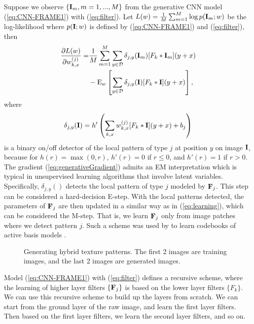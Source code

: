 \documentclass[letterpaper]{article}
\def\E{{\rm E}}
\def\I{{\bf I}}
\def\F{{\bf F}}
\begin{document}
Suppose we observe $\{\I_m, m = 1, ..., M\}$ from  the generative CNN model (\ref{eq:CNN-FRAME1}) with (\ref{eq:filter}). Let $L(w) = \frac{1}{M} \sum_{m=1}^{M} \log p(\I_m; w)$ be the log-likelihood where $p(\I; w)$ is defined by (\ref{eq:CNN-FRAME1}) and (\ref{eq:filter}), then 
\begin{equation}
\begin{aligned}
\frac{\partial L(w)}{\partial w_{k, x}^{(j)}} =& \frac{1}{M} \sum_{m=1}^{M}\sum_{y \in {\cal D}} \delta_{j, y}(\I_m)  [F_{k} * \I_m](y+x) \\
      &   -  \E_{w} \left[ \sum_{y \in {\cal D}} \delta_{j, y}(\I)  [F_{k} * \I](y+x)\right], 
\end{aligned}
\label{eq:generativeGradient}
\end{equation}
where 
\begin{eqnarray}
\delta_{j, y}(\I) = h'\left( \sum_{k,  x} w^{(j)}_{k,   x}  [F_{k} * \I](y+x) +b_j\right)
\label{eq:detector}
\end{eqnarray}
is a binary on/off detector of the local pattern of type $j$ at position $y$ on image $\I$,  because for $h(r) = \max(0, r)$, $h'(r) = 0$ if $r  \leq  0$, and $h'(r) = 1$ if $r > 0$.  The gradient (\ref{eq:generativeGradient}) admits an EM \citep{dempster1977maximum} interpretation which is typical in unsupervised learning algorithms that involve latent  variables. Specifically, $\delta_{j, y}()$ detects the local pattern of type $j$  modeled by $\F_j$. This step can be considered a hard-decision E-step. With the local patterns detected,  the parameters of $\F_j$ are then updated in a similar way as in (\ref{eq:learning}),  which can be considered the M-step. That is, we learn $\F_j$ only from image patches where we detect pattern  $j$. Such a scheme was used by \cite{Hongyi2014} to learn codebooks of active basis models \citep{AB}. 


\begin{figure}
	\centering
	\setlength{\fboxrule}{1pt}
	\setlength{\fboxsep}{0cm}
			\caption{Generating hybrid texture patterns. 
		The first 2 images are training images, and the last 2 images are generated images. }
	\label{fig:hybrid2}
\end{figure}


Model (\ref{eq:CNN-FRAME1}) with (\ref{eq:filter}) defines a recursive scheme, where the learning of higher layer filters $\{\F_j\}$ is based on the lower layer filters $\{F_k\}$.  We can use this recursive scheme to build up the layers from scratch. We can start from the ground  layer of the raw image, and learn the first layer filters. Then based on the first layer filters, we learn the second layer filters, and so on.  
\end{document}
